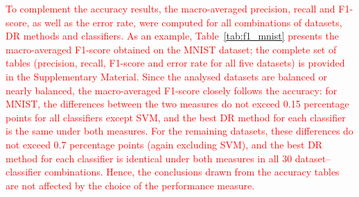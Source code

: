 \documentclass[a4paper,fleqn]{cas-dc}
\begin{document}
\textcolor{red}{To complement the accuracy results, the macro-averaged precision, recall and F1-score, as well as the error rate, were computed for all combinations of datasets, DR methods and classifiers. As an example, Table~\ref{tab:f1_mnist} presents the macro-averaged F1-score obtained on the MNIST dataset; the complete set of tables (precision, recall, F1-score and error rate for all five datasets) is provided in the Supplementary Material. Since the analysed datasets are balanced or nearly balanced, the macro-averaged F1-score closely follows the accuracy: for MNIST, the differences between the two measures do not exceed 0.15 percentage points for all classifiers except SVM, and the best DR method for each classifier is the same under both measures. For the remaining datasets, these differences do not exceed 0.7 percentage points (again excluding SVM), and the best DR method for each classifier is identical under both measures in all 30 dataset--classifier combinations. Hence, the conclusions drawn from the accuracy tables are not affected by the choice of the performance measure.}
\end{document}
